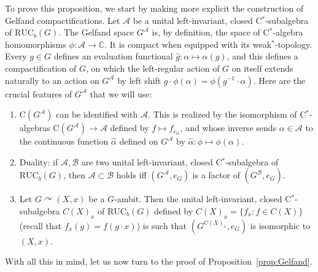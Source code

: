 \documentclass[11pt]{article}
\theoremstyle{definition}
\numberwithin{equation}{section}
\numberwithin{figure}{section}
\numberwithin{table}{section}
\newcommand{\A}{\mathcal A}
\newcommand{\CC}{\mathbb{C}}
\newcommand{\actson}{\curvearrowright}
\newcommand{\RUCB}{\mathrm{RUC}_{b}}
\begin{document}
To prove this proposition, we start by making more explicit the construction of Gelfand compactifications. Let $\A$ be a unital left-invariant, closed C$^{*}$-subalgebra of $\RUCB(G)$. The Gelfand space $G^{\A}$ is, by definition, the space of C$^{*}$-algebra homomorphisms $\phi:\A\rightarrow \CC$. It is compact when equipped with its weak$^{*}$-topology. Every $g\in G$ defines an evaluation functional $\hat g:\alpha\mapsto\alpha(g)$, and this defines a compactification of $G$, on which the left-regular action of $G$ on itself extends naturally to an action on $G^{\A}$ by left shift $g\cdot \phi(\alpha)=\phi(g^{-1}\cdot \alpha)$. Here are the crucial features of $G^{\A}$ that we will use:
\begin{enumerate}
\item $\mathrm C(G^{\A})$ can be identified with $\A$. This is realized by the isomorphism of C$^{*}$-algebras $\mathrm C(G^{\A})\to\A$ defined by $f\mapsto f_{e_{G}}$, and whose inverse sends $\alpha\in \A$ to the continuous function $\hat \alpha$ defined on $G^{\A}$ by $\hat \alpha : \phi\mapsto \phi(\alpha)$.
\item Duality: if $\A, \mathcal B$ are two unital left-invariant, closed C$^{*}$-subalgebra of $\RUCB(G)$, then $\A \subset \mathcal B$ holds iff $(G^{\A}, e_{G})$ is a factor of $(G^{\mathcal B}, e_{G})$.
\item Let $G\actson(X,x)$ be a $G$-ambit. Then the unital left-invariant, closed C$^{*}$-subalgebra $C(X)_{x}$ of $\RUCB(G)$ defined by $C(X)_{x} = \{ f_{x}:f\in C(X)\}$ (recall that $f_{x}(g)=f(g\cdot x)$) is such that $(G^{C(X)_{x}},e_{G})$ is isomorphic to $(X,x)$.
\end{enumerate}

With all this in mind, let us now turn to the proof of Proposition~\ref{prop:Gelfand}.
\end{document}
